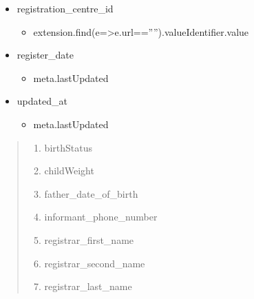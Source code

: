 \documentclass[letterpaper,10pt,english]{sphinxmanual}
\begin{document}
\begin{itemize}
\begin{itemize}
\end{itemize}

\item {} 
\sphinxAtStartPar
registration\_centre\_id
\begin{itemize}
\item {} 
\sphinxAtStartPar
extension.find(e=\textgreater{}e.url==””).valueIdentifier.value

\end{itemize}

\item {} 
\sphinxAtStartPar
register\_date
\begin{itemize}
\item {} 
\sphinxAtStartPar
meta.lastUpdated

\end{itemize}

\item {} 
\sphinxAtStartPar
updated\_at
\begin{itemize}
\item {} 
\sphinxAtStartPar
meta.lastUpdated

\end{itemize}

\end{itemize}

\sphinxAtStartPar
{}
\begin{quote}
\begin{enumerate}
%
\item {} 
\sphinxAtStartPar
birthStatus

\item {} 
\sphinxAtStartPar
childWeight

\item {} 
\sphinxAtStartPar
father\_date\_of\_birth

\item {} 
\sphinxAtStartPar
informant\_phone\_number

\item {} 
\sphinxAtStartPar
registrar\_first\_name

\item {} 
\sphinxAtStartPar
registrar\_second\_name

\item {} 
\sphinxAtStartPar
registrar\_last\_name

\end{enumerate}


\end{quote}



\renewcommand{\indexname}{Index}
\printindex
\end{document}
